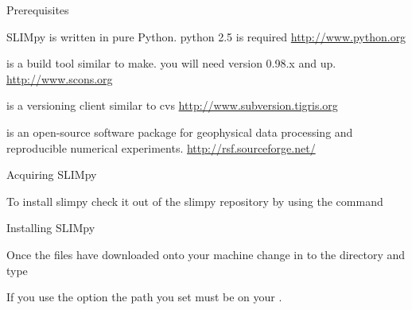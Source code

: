 



\par{Prerequisites}

\begin{definitions}

	 SLIMpy is written in pure Python. python 2.5 is required 
	\url{http://www.python.org}
	
	 is a build tool similar to make. you will need version 0.98.x and
	up.
 	\url{http://www.scons.org}
	
	 is a versioning client similar to cvs \url{http://www.subversion.tigris.org}
	
	 is an open-source software package for geophysical data
	processing and reproducible numerical experiments.
	\url{http://rsf.sourceforge.net/}
	
	
\end{definitions}


\par{Acquiring SLIMpy }


To install slimpy check it out of the slimpy repository by using the command 


\par{Installing SLIMpy }

Once the files have downloaded onto your machine change
in to the  directory and type



\begin{notice} [note] 
If you use the  option the path you set must be on your .
\end{notice}

